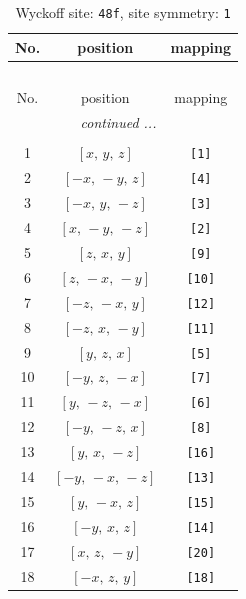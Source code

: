 \documentclass[fleqn,8pt]{jsarticle}
\begin{document}
\renewcommand{\arraystretch}{1.2}
\begin{longtable}{ccc}
\caption{Wyckoff site: {\tt 48f}, site symmetry: {\tt 1}}
 \\
 \hline \hline
No. & position & mapping \\ \hline \endfirsthead

\multicolumn{2}{l}{\tablename\ \thetable{}} \\
 \hline \hline
No. & position & mapping \\ \hline \endhead

 \hline \hline
\multicolumn{2}{r}{\footnotesize\it continued ...} \\ \endfoot

 \hline \hline
\multicolumn{2}{r}{} \\ \endlastfoot

1 & $\left[ x,\, y,\, z \right]$ & {\tt [1]} \\ \hline
2 & $\left[ - x,\, - y,\, z \right]$ & {\tt [4]} \\ \hline
3 & $\left[ - x,\, y,\, - z \right]$ & {\tt [3]} \\ \hline
4 & $\left[ x,\, - y,\, - z \right]$ & {\tt [2]} \\ \hline
5 & $\left[ z,\, x,\, y \right]$ & {\tt [9]} \\ \hline
6 & $\left[ z,\, - x,\, - y \right]$ & {\tt [10]} \\ \hline
7 & $\left[ - z,\, - x,\, y \right]$ & {\tt [12]} \\ \hline
8 & $\left[ - z,\, x,\, - y \right]$ & {\tt [11]} \\ \hline
9 & $\left[ y,\, z,\, x \right]$ & {\tt [5]} \\ \hline
10 & $\left[ - y,\, z,\, - x \right]$ & {\tt [7]} \\ \hline
11 & $\left[ y,\, - z,\, - x \right]$ & {\tt [6]} \\ \hline
12 & $\left[ - y,\, - z,\, x \right]$ & {\tt [8]} \\ \hline
13 & $\left[ y,\, x,\, - z \right]$ & {\tt [16]} \\ \hline
14 & $\left[ - y,\, - x,\, - z \right]$ & {\tt [13]} \\ \hline
15 & $\left[ y,\, - x,\, z \right]$ & {\tt [15]} \\ \hline
16 & $\left[ - y,\, x,\, z \right]$ & {\tt [14]} \\ \hline
17 & $\left[ x,\, z,\, - y \right]$ & {\tt [20]} \\ \hline
18 & $\left[ - x,\, z,\, y \right]$ & {\tt [18]} \\ \hline

\end{longtable}
\end{document}
